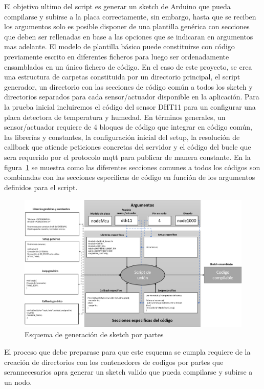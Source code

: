 El objetivo ultimo del \gls{script} es generar un \gls{sketch} de Arduino que pueda compilarse y subirse a la placa correctamente, sin embargo, hasta que se reciben los argumentos solo es posible disponer de una plantilla genérica con secciones que deben ser rellenadas en base a las opciones que se indicaran en argumentos mas adelante. El modelo de plantilla básico puede constituirse con código previamente escrito en diferentes ficheros para luego ser ordenadamente ensamblados en un único fichero de código. En el caso de este proyecto, se crea una estructura de carpetas constituida por un directorio principal, el script generador, un directorio con las secciones de código común a todos los \gls{sketch} y directorios separados para cada sensor/actuador disponible en la aplicación. Para la prueba inicial incluiremos el código del sensor DHT11 para un configurar una placa detectora de temperatura y humedad. En términos generales, un sensor/actuador requiere de 4 bloques de código que integrar en código común, las librerías y constantes, la configuración inicial del setup, la resolución de callback que atiende peticiones concretas del servidor y el código del bucle que sera requerido por el protocolo \gls{mqtt} para publicar de manera constante. En la figura~\ref{sketchgeneratordiagram} se muestra como las diferentes secciones comunes a todos los códigos son combinadas con las secciones especificas de código en función de los argumentos definidos para el script.

\vspace{0.5cm}
\begin{figure}[hbt!]
\label{sketchgeneratordiagram}
\centering
\includegraphics[height=2.6in]{figures/sketchgenerator.png}
\caption[Esquema de generación de sketch por partes]{Esquema de generación de sketch por partes\footnotemark}
\end{figure}

El proceso que debe preparase para que este esquema se cumpla requiere de la creación de directorios con los contenedores de codigos por partes que serannecesarios apra generar un \gls{sketch} valido que pueda compilarse y subirse a un nodo.

